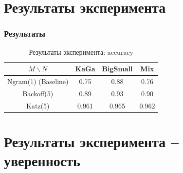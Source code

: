 \documentclass[aspectratio=169, pdf, 9pt, utf8]{beamer}
\newcommand{\KG}{\textbf{KaGa}}
\newcommand{\BS}{\textbf{BigSmall}}
\newcommand{\MX}{\textbf{Mix}}
\begin{document}
\section{ Результаты эксперимента }

\begin{frame}
	\frametitle{Результаты}
	
	\begin{table}[H]
		\begin{center}
			
			\begin{tabular}{|c|c|c|c|}\hline
				$M \backslash N$ & \KG & \BS & \MX \\ \hline
				Ngram(1) (Baseline) & 0.75 & 0.88 & 0.76 \\
				Backoff(5) & 0.89 & 0.93 & 0.90 \\
				Katz(5) & 0.961 & 0.965 & 0.962 \\ \hline 	
			\end{tabular}
			\caption{Результаты эксперимента: accuracy}
			\label{table:exp1}
		\end{center}
	\end{table}
\end{frame}

\section{ Результаты эксперимента -- уверенность }
\end{document}
